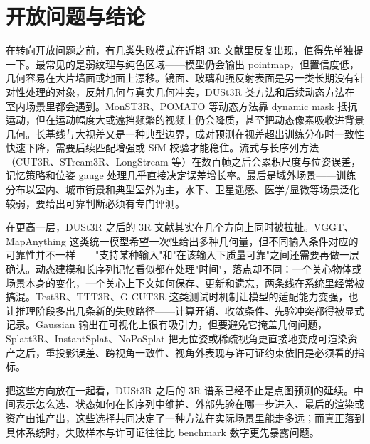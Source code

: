 \documentclass[UTF8,a4paper,zihao=-4,fontset=windows]{ctexart}
\begin{document}
\section{开放问题与结论}

在转向开放问题之前，有几类失败模式在近期 3R 文献里反复出现，值得先单独提一下。最常见的是弱纹理与纯色区域——模型仍会输出 pointmap，但置信度低，几何容易在大片墙面或地面上漂移。镜面、玻璃和强反射表面是另一类长期没有针对性处理的对象，反射几何与真实几何冲突，DUSt3R 类方法和后续动态方法在室内场景里都会遇到。MonST3R、POMATO 等动态方法靠 dynamic mask 抵抗运动，但在运动幅度大或遮挡频繁的视频上仍会降质，甚至把动态像素吸收进背景几何。长基线与大视差又是一种典型边界，成对预测在视差超出训练分布时一致性快速下降，需要后续匹配增强或 SfM 校验才能稳住。流式与长序列方法（CUT3R、STream3R、LongStream 等）在数百帧之后会累积尺度与位姿误差，记忆策略和位姿 gauge 处理几乎直接决定误差增长率。最后是域外场景——训练分布以室内、城市街景和典型室外为主，水下、卫星遥感、医学/显微等场景泛化较弱，要给出可靠判断必须有专门评测。

在更高一层，DUSt3R 之后的 3R 文献其实在几个方向上同时被拉扯。VGGT、MapAnything 这类统一模型希望一次性给出多种几何量，但不同输入条件对应的可靠性并不一样——"支持某种输入"和"在该输入下质量可靠"之间还需要再做一层确认。动态建模和长序列记忆看似都在处理"时间"，落点却不同：一个关心物体或场景本身的变化，一个关心上下文如何保存、更新和遗忘，两条线在系统里经常被搞混。Test3R、TTT3R、G-CUT3R 这类测试时机制让模型的适配能力变强，也让推理阶段多出几条新的失败路径——计算开销、收敛条件、先验冲突都得被显式记录。Gaussian 输出在可视化上很有吸引力，但要避免它掩盖几何问题，Splatt3R、InstantSplat、NoPoSplat 把无位姿或稀疏视角更直接地变成可渲染资产之后，重投影误差、跨视角一致性、视角外表现与许可证约束依旧是必须看的指标。

把这些方向放在一起看，DUSt3R 之后的 3R 谱系已经不止是点图预测的延续。中间表示怎么选、状态如何在长序列中维护、外部先验在哪一步进入、最后的渲染或资产由谁产出，这些选择共同决定了一种方法在实际场景里能走多远；而真正落到具体系统时，失败样本与许可证往往比 benchmark 数字更先暴露问题。



\end{document}
